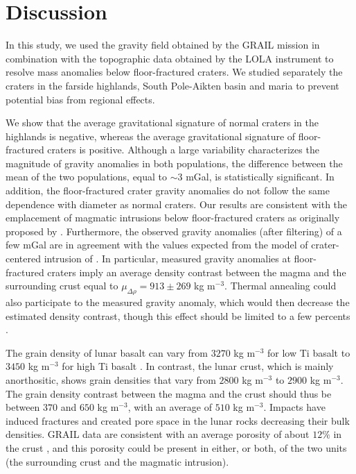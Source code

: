\section{Discussion}
\label{C6-sec:discussion}

In  this study,  we  used  the gravity  field  obtained  by the  GRAIL
mission in combination with the topographic data obtained by the LOLA
instrument to  resolve mass anomalies below  floor-fractured craters.
We  studied separately  the craters  in the  farside highlands,  South
Pole-Aikten basin  and maria to  prevent potential bias  from regional
effects.

We show that the average  gravitational signature of normal craters in
the highlands is negative, whereas the average gravitational signature
of floor-fractured craters is  positive.  Although a large variability
characterizes the magnitude of  gravity anomalies in both populations,
the  difference between  the mean  of  the two  populations, equal  to
$\sim  3$  mGal,  is  statistically  significant.   In  addition,  the
floor-fractured  crater  gravity  anomalies  do not  follow  the  same
dependence  with   diameter  as  normal  craters.    Our  results  are
consistent  with   the  emplacement   of  magmatic   intrusions  below
floor-fractured     craters     as      originally     proposed     by
\citet{Schultz:1976kt}.  Furthermore,  the observed  gravity anomalies
(after  filtering) of  a few  mGal are  in agreement  with the  values
expected   from   the   model    of   crater-centered   intrusion   of
\citet{Thorey:2014cv}.  In  particular, measured gravity  anomalies at
floor-fractured craters imply an  average density contrast between the
magma      and      the      surrounding      crust      equal      to
$\mu_{\Delta \rho} = 913 \pm 269$ kg m$^{-3}$. Thermal annealing could
also participate  to the  measured gravity  anomaly, which  would then
decrease the estimated density contrast,  though this effect should be
limited to a few percents \citep{Michaut:2011dt,Kiefer:2013hr}.

The grain density of lunar basalt can vary from $3270$ kg m$^{-3}$ for
low   Ti  basalt   to  $3450$   kg   m$^{-3}$  for   high  Ti   basalt
\citep{Kiefer:2012kp}.  In contrast, the  lunar crust, which is mainly
anorthositic, shows grain densities that  vary from $2800$ kg m$^{-3}$
to $ 2900$  kg m$^{-3}$. The grain density contrast  between the magma
and the crust should thus be between $370$ and $650$ kg m$^{-3}$, with
an average  of $510$ kg  m$^{-3}$. Impacts have induced  fractures and
created pore space in the lunar rocks decreasing their bulk densities.
GRAIL data are consistent with an  average porosity of about $12\%$ in
the  crust  \citep{Wieczorek:2013ipa},  and  this  porosity  could  be
present in  either, or both, of  the two units (the  surrounding crust
and the magmatic intrusion).

